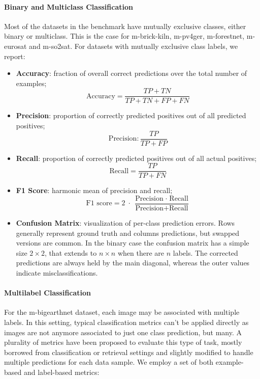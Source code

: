 \documentclass[a4paper, oneside, english]{sapthesis} %
\begin{document}
\paragraph{Binary and Multiclass Classification}

Most of the datasets in the benchmark have mutually exclusive classes, either binary or multiclass. This is the case for m-brick-kiln, m-pv4ger, m-forestnet, m-eurosat and m-so2sat. For datasets with mutually exclusive class labels, we report:

\begin{itemize}
    \item \textbf{Accuracy}: fraction of overall correct predictions over the total number of examples;
    $$
    \text{Accuracy} = \frac{TP + TN}{TP + TN + FP + FN}
    $$
    \item \textbf{Precision}: proportion of correctly predicted positives out of all predicted positives;
    $$
    \text{Precision}: \frac{TP}{TP + FP}
    $$
    \item \textbf{Recall}: proportion of correctly predicted positives out of all actual positives;
    $$
    \text{Recall} = \frac{TP}{TP + FN}
    $$
    \item \textbf{F1 Score}: harmonic mean of precision and recall;
    $$
    \text{F1 score} = 2 \;\cdot\; \frac{\text{Precision} \;\cdot\; \text{Recall}}{\text{Precision} + \text{Recall}}
    $$
    \item \textbf{Confusion Matrix}: visualization of per-class prediction errors. Rows generally represent ground truth and columns predictions, but swapped versions are common. In the binary case the confusion matrix has a simple size $2\times2$, that extends to $n \times n$ when there are $n$ labels. The corrected predictions are always held by the main diagonal, whereas the outer values indicate misclassifications.
\end{itemize}

\paragraph{Multilabel Classification} For the m-bigearthnet dataset, each image may be associated with multiple labels. In this setting, typical  classification metrics can't be applied directly as images are not anymore associated to just one class prediction, but many. A plurality of metrics \cite{zhang2013review} have been proposed to evaluate this type of task, mostly borrowed from classification or retrieval settings and slightly modified to handle multiple predictions for each data sample. We employ a set of both example-based and label-based metrics:
\end{document}
